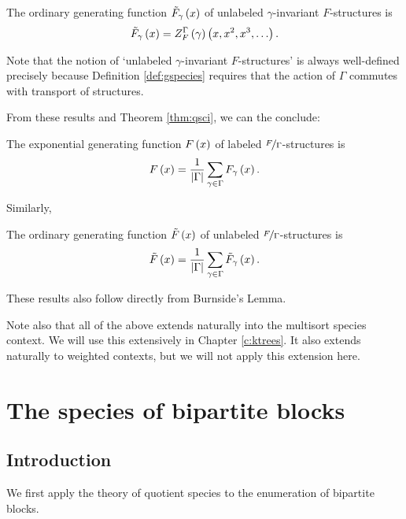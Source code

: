 \documentclass[distribution,draft]{brandiss} %
\numberwithin{section}{chapter}
\numberwithin{figure}{chapter}
\begin{document}
\begin{theorem}
  \label{thm:gciogf}
  The ordinary generating function $\tilde{F}_{\gamma} \left( {x} \right)$ of unlabeled $\gamma$-invariant $F$-structures is
  \begin{equation}
    \label{eq:gciogf}
    \tilde{F}_{\gamma} \left( {x} \right) =  Z_{F}^{{\Gamma} {}} \left( {\gamma} \right)  \left( {x, x^{2}, x^{3}, \dots} \right).
  \end{equation}
\end{theorem}
Note that the notion of `unlabeled $\gamma$-invariant $F$-structures' is always well-defined precisely because Definition \ref{def:gspecies} requires that the action of $\Gamma$ commutes with transport of structures.

From these results and Theorem \ref{thm:qsci}, we can the conclude:
\begin{theorem}
  \label{qgciegf}
  The exponential generating function $F \left( {x} \right)$ of labeled $\nicefrac{F}{\Gamma}$-structures is
  \begin{equation}
    \label{eq:qgciegf}
    F \left( {x} \right) = \frac{1}{\left\vert {\Gamma} \right\vert} \sum_{\gamma \in \Gamma} F_{\gamma} \left( {x} \right).
  \end{equation}
\end{theorem}

Similarly,
\begin{theorem}
  \label{qgciogf}
  The ordinary generating function $\tilde{F} \left( {x} \right)$ of unlabeled $\nicefrac{F}{\Gamma}$-structures is
  \begin{equation}
    \label{eq:qgcogf}
    \tilde{F} \left( {x} \right) = \frac{1}{\left\vert {\Gamma} \right\vert} \sum_{\gamma \in \Gamma} \tilde{F}_{\gamma} \left( {x} \right).
  \end{equation}
\end{theorem}

These results also follow directly from Burnside's Lemma.

Note also that all of the above extends naturally into the multisort species context.
We will use this extensively in Chapter \ref{c:ktrees}.
It also extends naturally to weighted contexts, but we will not apply this extension here.

\chapter{The species of bipartite blocks}\label{c:bpblocks}
\section{Introduction}\label{s:bpintro}
We first apply the theory of quotient species to the enumeration of bipartite blocks.
\end{document}
